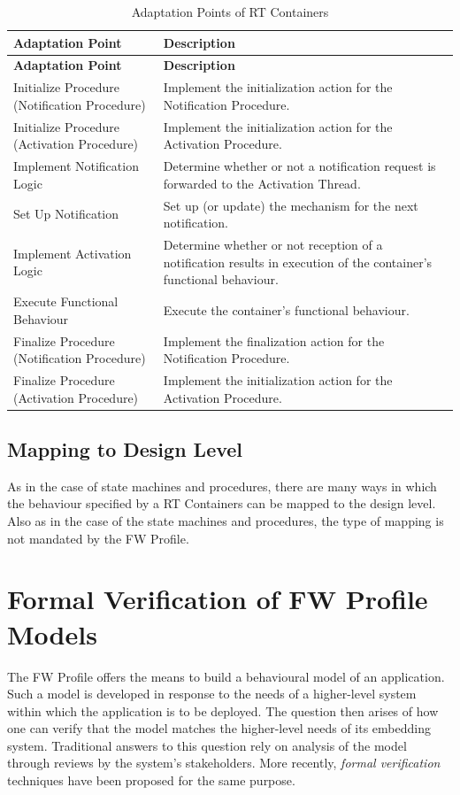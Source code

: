 \documentclass[a4paper,10pt]{article}
\let\stdsection\section
\renewcommand\section{\newpage\stdsection}
\begin{document}
\begin{longtable}{|>{\raggedright\arraybackslash}p{3.9cm}|p{7.3cm}|}
\caption{Adaptation Points of RT Containers} \label{tab:rtAdaptPoints}\\
\hline
\rowcolor{lightblue}
\textbf{Adaptation Point} & \textbf{Description} \\
\hline\hline
\endfirsthead
\rowcolor{lightblue}
\textbf{Adaptation Point} & \textbf{Description} \\
\hline\hline
\endhead
Initialize Procedure (Notification Procedure) & Implement the initialization action for the Notification Procedure. \\
\hline
Initialize Procedure (Activation Procedure) & Implement the initialization action for the Activation Procedure. \\
\hline
Implement Notification Logic & Determine whether or not a notification request is forwarded to the Activation Thread. \\
\hline
Set Up Notification & Set up (or update) the mechanism for the next notification. \\
\hline
Implement Activation Logic & Determine whether or not reception of a notification results in execution of the container's functional behaviour. \\
\hline
Execute Functional Behaviour & Execute the container's functional behaviour. \\
\hline
Finalize Procedure (Notification Procedure) & Implement the finalization action for the Notification Procedure. \\
\hline
Finalize Procedure (Activation Procedure) & Implement the initialization action for the Activation Procedure. \\
\hline
\end{longtable}

\subsection{Mapping to Design Level}
As in the case of state machines and procedures, there are many ways in which the behaviour
specified by a RT Containers can be mapped to the design level. Also as in the case of the state machines and procedures, the type of mapping is not mandated by the FW Profile.

\section{Formal Verification of FW Profile Models}\label{sec:formalVerification}
The FW Profile offers the means to build a behavioural model of an application. Such a model is developed in response to the needs of a higher-level system within which the application is to be deployed. The question then arises of how one can verify that the model matches the higher-level needs of its embedding system. Traditional answers to this question rely on analysis of the model through reviews by the system's stakeholders. More recently, \textit{formal verification} techniques have been proposed for the same purpose.
\end{document}
